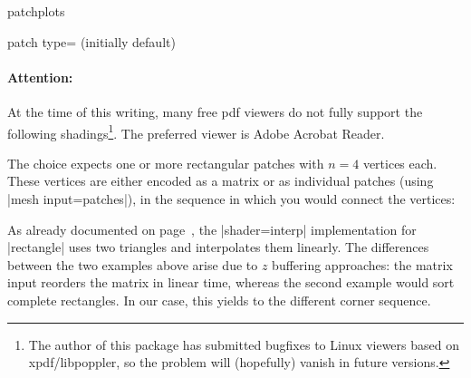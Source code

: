 {\begin{pgfplotslibrary}{patchplots}
\begin{pgfplotskey}{patch type= (initially default)}
	\paragraph{Attention:} At the time of this writing, many free pdf viewers do not fully support the following shadings\footnote{The author of this package has submitted bugfixes to Linux viewers based on xpdf/libpoppler, so the problem will (hopefully) vanish in future versions.}. The preferred viewer is Adobe Acrobat Reader.

	The choice  expects one or more rectangular patches with $n=4$ vertices each. These vertices are either encoded as a matrix or as individual patches (using |mesh input=patches|), in the sequence in which you would connect the vertices:
\begin{codeexample}[]
\end{codeexample}
\begin{codeexample}[]
\end{codeexample}
	\noindent As already documented on page~\pageref{key:patch:type}, the |shader=interp| implementation for |rectangle| uses two triangles and interpolates them linearly. The differences between the two examples above arise due to $z$ buffering approaches: the matrix input reorders the matrix in linear time, whereas the second example would sort complete rectangles. In our case, this yields to the different corner sequence.


\end{pgfplotskey}
\end{pgfplotslibrary}}
